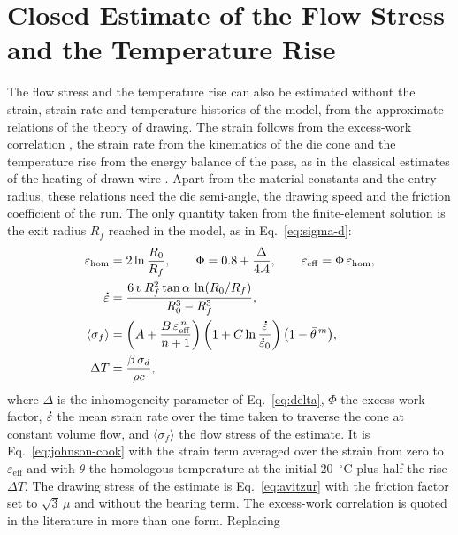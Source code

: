 \documentclass[subscriptcorrection,upint,varvw,barcolor=Goldenrod3,mathalfa=cal=euler,balance,hyphenate,french,pdf-a]{asmejour} %
\newcommand{\edot}{\accentset{\scalebox{0.4}{$\bullet$}}{\varepsilon}}
\begin{document}
\section{Closed Estimate of the Flow Stress and the Temperature Rise}\label{app:closed}

The flow stress and the temperature rise can also be estimated without the strain, strain-rate and
temperature histories of the model, from the approximate relations of the theory of drawing. The
strain follows from the excess-work correlation \citep{backofen1972deformation}, the strain rate
from the kinematics of the die cone and the temperature rise from the energy balance of the pass,
as in the classical estimates of the heating of drawn wire \citep{siebel1943erwaermung}. Apart from
the material constants and the entry radius, these relations need the die semi-angle, the drawing
speed and the friction coefficient of the run. The only quantity taken from the finite-element
solution is the exit radius $R_f$ reached in the model, as in Eq.~\eqref{eq:sigma-d}:
\begin{align}
\varepsilon_{\mathrm{hom}} &= 2\ln\frac{R_0}{R_f}, \qquad
\Phi = 0.8 + \frac{\Delta}{4.4}, \qquad
\varepsilon_{\mathrm{eff}} = \Phi\,\varepsilon_{\mathrm{hom}}, \label{eq:closed-strain}\\
\edot &= \frac{6\,v\,R_f^2\tan\alpha\,\ln(R_0/R_f)}{R_0^3-R_f^3}, \label{eq:closed-rate}\\
\langle\sigma_f\rangle &= \left(A + \frac{B\,\varepsilon_{\mathrm{eff}}^{\,n}}{n+1}\right)
  \left(1 + C\ln\frac{\edot}{\edot_0}\right)
  \bigl(1 - \bar\theta^{\,m}\bigr), \label{eq:closed-flow}\\
\Delta T &= \frac{\beta\,\sigma_d}{\rho c}, \label{eq:closed-rest}
\end{align}
where $\Delta$ is the inhomogeneity parameter of Eq.~\eqref{eq:delta}, $\Phi$ the excess-work factor, $\edot$ the mean strain rate over the time taken to
traverse the cone at constant volume flow, and $\langle\sigma_f\rangle$ the flow stress of the
estimate. It is Eq.~\eqref{eq:johnson-cook} with the strain term averaged over the strain from zero
to $\varepsilon_{\mathrm{eff}}$ and with $\bar\theta$ the homologous temperature at the initial
20~$^\circ$C plus half the rise $\Delta T$. The drawing stress of the estimate is
Eq.~\eqref{eq:avitzur} with the friction factor set to $\sqrt3\,\mu$ and without the bearing term. The
excess-work correlation is quoted in the literature in more than one form. Replacing
\end{document}
